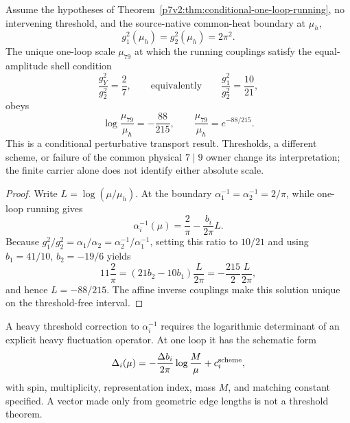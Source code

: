 \documentclass[12pt,a4paper]{article}
\begin{document}
\begin{corollary}
\label{p7:cor:conditional-common-heat-shell-transport}
Assume the hypotheses of
Theorem~\ref{p7v2:thm:conditional-one-loop-running}, no intervening threshold,
and the source-native common-heat boundary at \(\mu_h\),
\begin{equation}
 \label{p7:eq:common-heat-running-boundary}
 g_1^2(\mu_h)=g_2^2(\mu_h)=2\pi^2.
\end{equation}
The unique one-loop scale \(\mu_{79}\) at which the running couplings satisfy
the equal-amplitude shell condition
\begin{equation}
 \frac{g_Y^2}{g_2^2}=\frac27,
 \qquad\text{equivalently}\qquad
 \frac{g_1^2}{g_2^2}=\frac{10}{21},
\end{equation}
obeys
\begin{equation}
 \label{p7:eq:common-heat-shell-scale-ratio}
 \boxed{\log\frac{\mu_{79}}{\mu_h}=-\frac{88}{215},
 \qquad
 \frac{\mu_{79}}{\mu_h}=e^{-88/215}.}
\end{equation}
This is a conditional perturbative transport result.  Thresholds, a different
scheme, or failure of the common physical \(7\mid9\) owner change its
interpretation; the finite carrier alone does not identify either absolute
scale.
\end{corollary}

\begin{proof}
Write \(L=\log(\mu/\mu_h)\).  At the boundary
\(\alpha_1^{-1}=\alpha_2^{-1}=2/\pi\), while one-loop running gives
\[
 \alpha_i^{-1}(\mu)=\frac2\pi-\frac{b_i}{2\pi}L.
\]
Because \(g_1^2/g_2^2=\alpha_1/\alpha_2
=\alpha_2^{-1}/\alpha_1^{-1}\), setting this ratio to \(10/21\) and using
\(b_1=41/10\), \(b_2=-19/6\) yields
\[
 11\frac2\pi
 =\left(21b_2-10b_1\right)\frac{L}{2\pi}
 =-\frac{215}{2}\frac{L}{2\pi},
\]
and hence \(L=-88/215\).  The affine inverse couplings make this solution
unique on the threshold-free interval.
\end{proof}

\begin{proposition}
\label{p7v2:prop:threshold-obligation}
A heavy threshold correction to
\(\alpha_i^{-1}\) requires the logarithmic determinant of an explicit heavy
fluctuation operator.  At one loop it has the schematic form
\begin{equation}
\label{p7v2:eq:threshold-form}
 \Delta_i(\mu)
 =
 -\frac{\Delta b_i}{2\pi}\log\frac{M}{\mu}
 +c_i^{\rm scheme},
\end{equation}
with spin, multiplicity, representation index, mass \(M\), and matching
constant specified.  A vector made only from geometric edge lengths is not a
threshold theorem.
\end{proposition}
\end{document}
